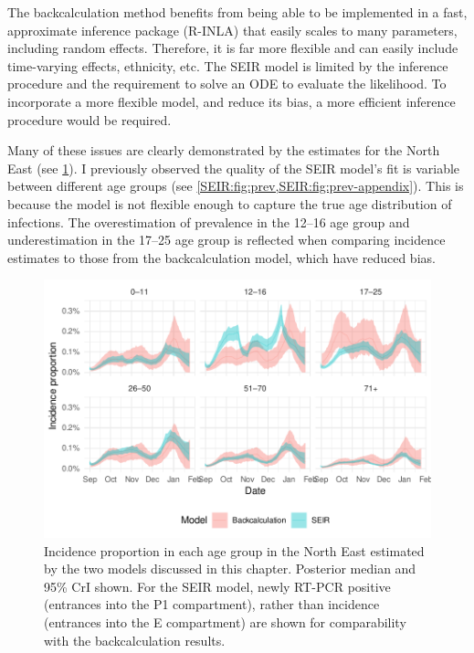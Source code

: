 \documentclass[thesis.tex]{subfiles}
\begin{document}
The backcalculation method benefits from being able to be implemented in a fast, approximate inference package (R-INLA) that easily scales to many parameters, including random effects.
Therefore, it is far more flexible and can easily include time-varying effects, ethnicity, etc.
The SEIR model is limited by the inference procedure and the requirement to solve an ODE to evaluate the likelihood.
To incorporate a more flexible model, and reduce its bias, a more efficient inference procedure would be required.

Many of these issues are clearly demonstrated by the estimates for the North East (see \cref{transmission:fig:compare-NE}).
I previously observed the quality of the SEIR model's fit is variable between different age groups (see \cref{SEIR:fig:prev,SEIR:fig:prev-appendix}).
This is because the model is not flexible enough to capture the true age distribution of infections.
The overestimation of prevalence in the 12--16 age group and underestimation in the 17--25 age group is reflected when comparing incidence estimates to those from the backcalculation model, which have reduced bias.
\begin{figure}
    \centering \includegraphics{transmission/compare-NE}
    \caption[Comparing each models estimate of North East incidence by age.]{%
        Incidence proportion in each age group in the North East estimated by the two models discussed in this chapter.
        Posterior median and 95\% CrI shown.
        For the SEIR model, newly RT-PCR positive (entrances into the P1 compartment), rather than incidence (entrances into the E compartment) are shown for comparability with the backcalculation results.
    }
    \label{transmission:fig:compare-NE}
\end{figure}
\end{document}
